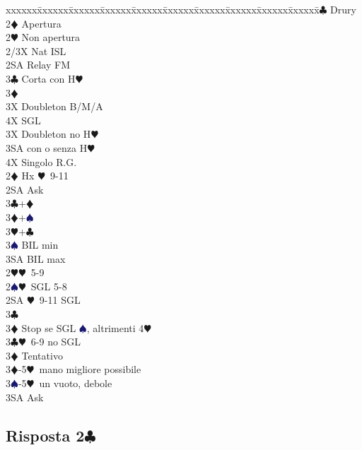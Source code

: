 \documentclass[a4paper,italian]{article}
\newcommand{\BC}{\textcolor{OliveGreen}{$\clubsuit$}}
\newcommand{\BD}{\textcolor{RedOrange}{$\vardiamondsuit$}}
\newcommand{\BH}{\textcolor{Red2}{$\varheartsuit${}}}
\newcommand{\BS}{\textcolor{MidnightBlue}{$\spadesuit${}}}
\newcommand{\pdfc}{\texorpdfstring{\BC{}}{C}}
\newenvironment{bidtable}
{\begin{tabbing}

    xxxxxx\=xxxxxx\=xxxxxx\=xxxxxx\=xxxxxx\=xxxxxx\=xxxxxx\=xxxxxx\=xxxxxx\=xxxxxx\=\kill}
{\end{tabbing} }%
\begin{document}
\begin{multicols}{2}
    \begin{bidtable}
        2\BC \> Drury\+\\
        2\BD \> Apertura\\
        2\BH \> Non apertura\\
        2/3X \> Nat ISL\\
        2SA \> Relay FM\+\\
        3\BC \> Corta con H\BH \+\\
        3\BD \> \textregistered\+\\
        3X \> Doubleton B/M/A\\
        4X \> SGL\-\-\\
        3X \> Doubleton no H\BH \\
        3SA  con o senza H\BH \\
        4X \> Singolo R.G.\-\-\\
        2\BD \> Hx \BH\ 9-11\+\\
        2SA \> Ask \+\\
        3\BC {}+\BD\\
        3\BD {}+\BS\\
        3\BH {}+\BC\\
        3\BS \> BIL min\\
        3SA \> BIL max\-\-\\
        2\BH {}\BH\ 5-9\\
        2\BS {}\BH\ SGL 5-8\\
        2SA \BH\ 9-11 SGL\+\\
        3\BC \> \textregistered\\
        3\BD \> Stop se SGL \BS, altrimenti 4\BH\-\\
        3\BC {}\BH\ 6-9 no SGL\+\\
        3\BD \> Tentativo \-\\
        3\BD {}-5\BH\ mano migliore possibile\\
        3\BS {}-5\BH\ un vuoto, debole\+\\
        3SA \> Ask
    \end{bidtable}
    \bigbreak

\end{multicols}

\pagebreak

\subsection{Risposta 2\pdfc}
\end{document}
